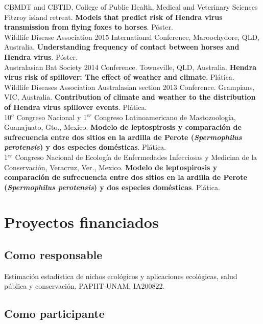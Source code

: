 \documentclass[11pt, letter]{article}
\newcommand{\years}[1]{\marginnote{\scriptsize #1}}
\begin{document}
\years{2016} CBMDT and CBTID, College of Public Health, Medical and Veterinary Sciences Fitzroy island retreat. \textbf{Models that predict risk of Hendra virus transmission from flying foxes to horses}. P\'oster.\\

\years{2015} Wildlife Disease Association 2015 International Conference, Maroochydore, QLD, Australia. \textbf{Understanding frequency of contact between horses and Hendra virus}. P\'oster.\\

\years{2014} Australasian Bat Society 2014 Conference. Townsville, QLD, Australia. \textbf{Hendra virus risk of spillover: The effect of weather and climate}. Pl\'atica.\\

\years{2013} Wildlife Diseases Association Australasian section 2013 Conference. Grampians, VIC, Australia. \textbf{Contribution of climate and weather to the distribution of Hendra virus spillover events}. Pl\'atica.\\

\years{2010} 10$^o$ Congreso Nacional y 1$^{er}$ Congreso Latinoamericano de Mastozoolog\'ia, Guanajuato, Gto., Mexico. \textbf{Modelo de leptospirosis y comparaci\'on de sufrecuencia entre dos sitios en la ardilla de Perote (\emph{Spermophilus 
		perotensis}) y dos especies dom\'esticas}. Pl\'atica.\\

\years{2009} 1$^{er}$ Congreso Nacional de Ecolog\'ia de Enfermedades Infecciosas y Medicina de la Conservaci\'on, Veracruz, Ver., Mexico. \textbf{Modelo de leptospirosis y comparaci\'on de sufrecuencia entre dos sitios en la ardilla de Perote (\emph{Spermophilus perotensis}) y dos especies dom\'esticas}. Pl\'atica.\\

\section*{Proyectos financiados}

\subsection*{Como responsable}

\years{2021} Estimación estadística de nichos ecológicos y aplicaciones ecológicas, salud pública y conservación, PAPIIT-UNAM, IA200822.

\subsection*{Como participante}
\end{document}

